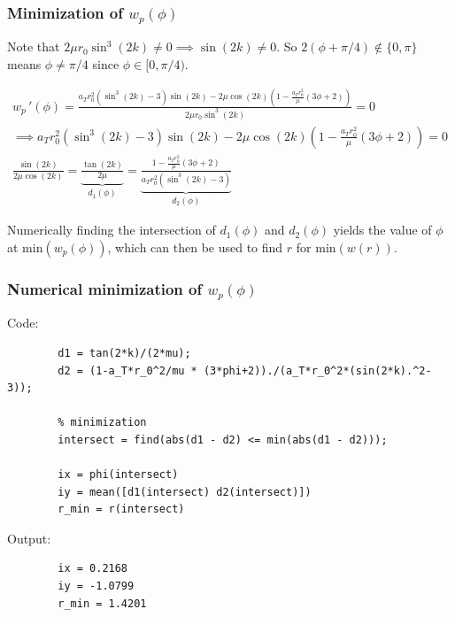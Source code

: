 \documentclass{beamer}
\begin{document}
\begin{frame}
    \frametitle{Minimization of $w_p(\phi)$}

    Note that $2\mu r_0\sin^3(2k)\neq 0\implies \sin(2k)\neq 0$. So $2(\phi+\pi/4)\not\in \{0,\pi\}$ means $\phi\neq \pi/4$ since $\phi\in [0,\pi/4)$.

    {\scriptsize\begin{gather}
        w_p\,'(\phi)=\frac{a_Tr_0^2\left(\sin^3(2k)-3\right)\sin(2k)-2\mu\cos(2k)\left(1-\frac{a_Tr_0^2}{\mu}(3\phi+2)\right)}{2\mu r_0\sin^3(2k)}=0\\
        \implies a_Tr_0^2\left(\sin^3(2k)-3\right)\sin(2k)-2\mu\cos(2k)\left(1-\frac{a_Tr_0^2}{\mu}(3\phi+2)\right)=0\\
        \frac{\sin(2k)}{2\mu\cos(2k)}=\underbrace{\frac{\tan(2k)}{2\mu}}_{d_1(\phi)}=\underbrace{\frac{1-\frac{a_Tr_0^2}{\mu}(3\phi+2)}{a_Tr_0^2(\sin^3(2k)-3)}}_{d_2(\phi)}
    \end{gather}}

    Numerically finding the intersection of $d_1(\phi)$ and $d_2(\phi)$ yields the value of $\phi$ at $\text{min}(w_p(\phi))$, which can then be used to find $r$ for $\text{min}(w(r))$.

\end{frame}

\begin{frame}[fragile]
    \frametitle{Numerical minimization of $w_p(\phi)$}

    Code:
    {\scriptsize\begin{verbatim}
        d1 = tan(2*k)/(2*mu);
        d2 = (1-a_T*r_0^2/mu * (3*phi+2))./(a_T*r_0^2*(sin(2*k).^2-3));

        % minimization
        intersect = find(abs(d1 - d2) <= min(abs(d1 - d2)));

        ix = phi(intersect)
        iy = mean([d1(intersect) d2(intersect)])
        r_min = r(intersect)
    \end{verbatim}}
    Output:

    \begin{verbatim}
        ix = 0.2168
        iy = -1.0799
        r_min = 1.4201
    \end{verbatim}

\end{frame}
\end{document}
